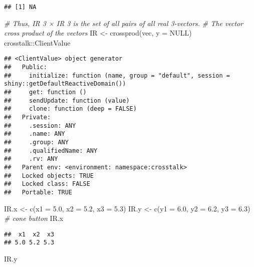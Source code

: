 \documentclass[
]{article}
\newenvironment{Shaded}{\begin{snugshade}}{\end{snugshade}}
\newcommand{\AttributeTok}[1]{\textcolor[rgb]{0.77,0.63,0.00}{#1}}
\newcommand{\CommentTok}[1]{\textcolor[rgb]{0.56,0.35,0.01}{\textit{#1}}}
\newcommand{\ConstantTok}[1]{\textcolor[rgb]{0.00,0.00,0.00}{#1}}
\newcommand{\FloatTok}[1]{\textcolor[rgb]{0.00,0.00,0.81}{#1}}
\newcommand{\FunctionTok}[1]{\textcolor[rgb]{0.00,0.00,0.00}{#1}}
\newcommand{\NormalTok}[1]{#1}
\newcommand{\OtherTok}[1]{\textcolor[rgb]{0.56,0.35,0.01}{#1}}
\newcommand{\SpecialCharTok}[1]{\textcolor[rgb]{0.00,0.00,0.00}{#1}}
\begin{document}
\begin{verbatim}
## [1] NA
\end{verbatim}

\begin{Shaded}
\begin{Highlighting}[]
\CommentTok{\# Thus, IR 3 × IR 3 is the set of all pairs of all real 3{-}vectors.}
\CommentTok{\# The vector cross product of the vectors}
\NormalTok{IR }\OtherTok{\textless{}{-}} \FunctionTok{crossprod}\NormalTok{(vec, }\AttributeTok{y =} \ConstantTok{NULL}\NormalTok{)}
\NormalTok{crosstalk}\SpecialCharTok{::}\NormalTok{ClientValue}
\end{Highlighting}
\end{Shaded}

\begin{verbatim}
## <ClientValue> object generator
##   Public:
##     initialize: function (name, group = "default", session = shiny::getDefaultReactiveDomain()) 
##     get: function () 
##     sendUpdate: function (value) 
##     clone: function (deep = FALSE) 
##   Private:
##     .session: ANY
##     .name: ANY
##     .group: ANY
##     .qualifiedName: ANY
##     .rv: ANY
##   Parent env: <environment: namespace:crosstalk>
##   Locked objects: TRUE
##   Locked class: FALSE
##   Portable: TRUE
\end{verbatim}

\begin{Shaded}
\begin{Highlighting}[]
\NormalTok{IR.x }\OtherTok{\textless{}{-}} \FunctionTok{c}\NormalTok{(}\AttributeTok{x1 =} \FloatTok{5.0}\NormalTok{, }\AttributeTok{x2 =} \FloatTok{5.2}\NormalTok{, }\AttributeTok{x3 =} \FloatTok{5.3}\NormalTok{)}
\NormalTok{IR.y }\OtherTok{\textless{}{-}} \FunctionTok{c}\NormalTok{(}\AttributeTok{y1 =} \FloatTok{6.0}\NormalTok{, }\AttributeTok{y2 =} \FloatTok{6.2}\NormalTok{, }\AttributeTok{y3 =} \FloatTok{6.3}\NormalTok{)}
\CommentTok{\# cone button}
\NormalTok{IR.x}
\end{Highlighting}
\end{Shaded}

\begin{verbatim}
##  x1  x2  x3 
## 5.0 5.2 5.3
\end{verbatim}

\begin{Shaded}
\begin{Highlighting}[]
\NormalTok{IR.y}
\end{Highlighting}
\end{Shaded}
\end{document}
